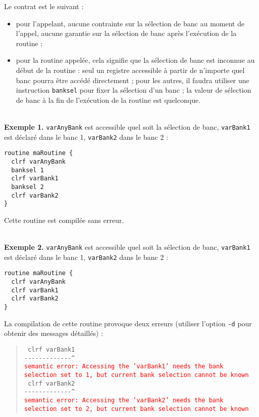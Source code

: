 
Le contrat est le suivant :
\begin{itemize}
\item pour l'appelant, aucune contrainte sur la sélection de banc au moment de l'appel, aucune garantie sur la sélection de banc après l'exécution de la routine ; 
\item pour la routine appelée, cela signifie que la sélection de banc est inconnue au début de la routine : seul un registre accessible à partir de n'importe quel banc pourra être accédé directement ; pour les autres, il faudra utiliser une instruction \texttt{banksel} pour fixer la sélection d'un banc ; la valeur de sélection de banc à la fin de l'exécution de la routine est quelconque.
\end{itemize}

~\\
\textbf{Exemple 1.} \texttt{varAnyBank} est accessible quel soit la sélection de banc, \texttt{varBank1} est déclaré dans le banc 1, \texttt{varBank2} dans le banc 2 :
\begin{lstlisting}[language=piccolo]
routine maRoutine {
  clrf varAnyBank
  banksel 1
  clrf varBank1
  banksel 2
  clrf varBank2
}
\end{lstlisting}

Cette routine est compilée sans erreur.


~\\
\textbf{Exemple 2.} \texttt{varAnyBank} est accessible quel soit la sélection de banc, \texttt{varBank1} est déclaré dans le banc 1, \texttt{varBank2} dans le banc 2 :
\begin{lstlisting}[language=piccolo]
routine maRoutine {
  clrf varAnyBank
  clrf varBank1
  clrf varBank2
}
\end{lstlisting}

La compilation de cette routine provoque deux erreurs (utiliser l’option \texttt{-d} pour obtenir des messages détaillés) :

\begin{quote}
\texttt{  clrf varBank1}\\
\texttt{-{-}-{-}-{-}-{-}-{-}-{-}-\^{}}\\
\textcolor{red}{\tt semantic error: Accessing the 'varBank1' needs the bank selection set to 1, but current bank selection cannot be known}\\

\texttt{  clrf varBank2}\\
\texttt{-{-}-{-}-{-}-{-}-{-}-{-}-\^}\\
\textcolor{red}{\tt semantic error: Accessing the 'varBank2' needs the bank selection set to 2, but current bank selection cannot be known}
\end{quote}




